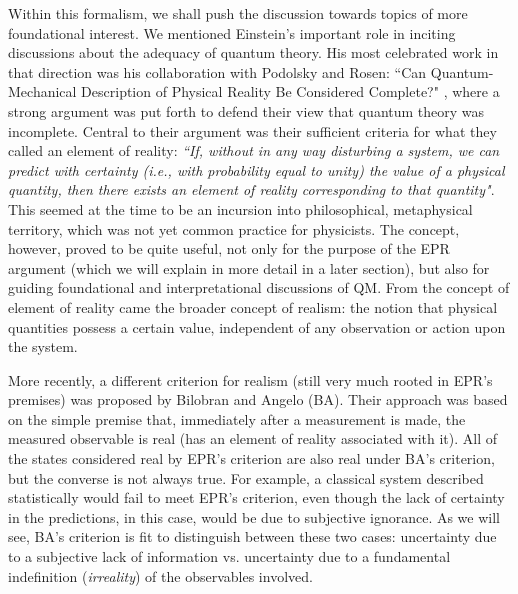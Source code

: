 \documentclass[12pt,a4paper,notitlepage]{report}
\begin{document}
Within this formalism, we shall push the discussion towards topics of more foundational interest. We mentioned Einstein's important role in inciting discussions about the adequacy of quantum theory. His most celebrated work in that direction was his collaboration with Podolsky and Rosen: ``Can Quantum-Mechanical Description of Physical Reality Be Considered Complete?" \cite{epr_1935}, where a strong argument was put forth to defend their view that quantum theory was incomplete. Central to their argument was their sufficient criteria for what they called an element of reality: {\it ``If, without in any way disturbing a system, we can predict with certainty (i.e., with probability equal to unity) the value of a physical quantity, then there exists an element of reality corresponding to that quantity"}. This seemed at the time to be an incursion into philosophical, metaphysical territory, which was not yet common practice for physicists. The concept, however, proved to be quite  useful, not only for the purpose of the EPR argument (which we will explain in more detail in a later section), but also for guiding foundational and interpretational discussions of QM. From the concept of element of reality came the broader concept of realism: the notion that physical quantities possess a certain value, independent of any observation or action upon the system.

More recently, a different criterion for realism (still very much rooted in EPR's premises) was proposed by Bilobran and Angelo (BA)\cite{bilobran_angelo_2015}. Their approach was based on the simple premise that, immediately after a measurement is made, the measured observable is real (has an element of reality associated with it). All of the states considered real by EPR's criterion are also real under BA's criterion, but the converse is not always true. For example, a classical system described statistically would fail to meet EPR's criterion, even though the lack of certainty in the predictions, in this case, would be due to subjective ignorance. As we will see, BA's criterion is fit to distinguish between these two cases: uncertainty due to a subjective lack of information vs. uncertainty due to a fundamental indefinition ({\it irreality}) of the observables involved. 
\end{document}
